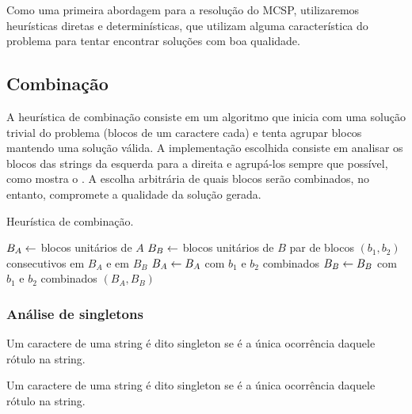 Como uma primeira abordagem para a resolução do MCSP, utilizaremos heurísticas diretas e determinísticas, que utilizam alguma característica do problema para tentar encontrar soluções com boa qualidade. 

\subsection{Combinação}

    A heurística de combinação consiste em um algoritmo que inicia com uma solução trivial do problema (blocos de um caractere cada) e tenta agrupar blocos mantendo uma solução válida. A implementação escolhida consiste em analisar os blocos das strings da esquerda para a direita e agrupá-los sempre que possível, como mostra o . A escolha arbitrária de quais blocos serão combinados, no entanto, compromete a qualidade da solução gerada.

    \begin{algorithm}[htb]
        \caption{Heurística de combinação.} \label{alg:combine}
        \begin{codebox}
        \li $B_A \leftarrow$ blocos unitários de $A$
        \li $B_B \leftarrow$ blocos unitários de $B$
        \li \Para \Cada par de blocos $(b_1, b_2)$ consecutivos em $B_A$ e em $B_B$ \Faca
            \Do
        \li     $B_A \leftarrow B_A$ com $b_1$ e $b_2$ combinados
        \li     $B_B \leftarrow B_B$ com $b_1$ e $b_2$ combinados
            \End
        \li \Devolva $(B_A, B_B)$
        \end{codebox}
    \end{algorithm}

    \subsubsection{Análise de singletons}

        \begin{definition}[Rótulo]
            Um caractere de uma string é dito singleton se é a única ocorrência daquele rótulo na string.
        \end{definition}

        \begin{definition}[Singleton]
            Um caractere de uma string é dito singleton se é a única ocorrência daquele rótulo na string.
        \end{definition}

